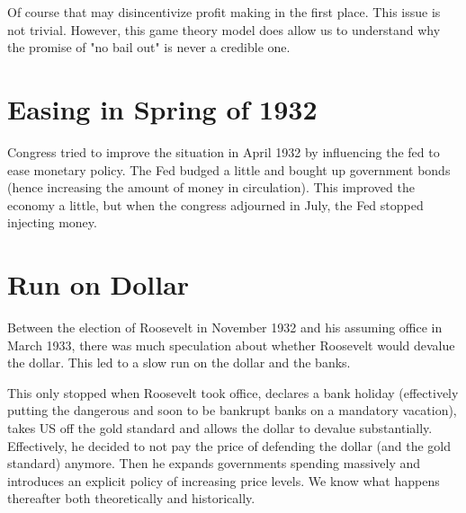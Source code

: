\documentclass[11pt]{scrartcl}
\begin{document}
Of course that may disincentivize profit making in the first place. This issue is not trivial. However, this game theory model does allow us to understand why the promise of "no bail out" is never a credible one.

\section{Easing in Spring of 1932}

Congress tried to improve the situation in April 1932 by influencing the fed to ease monetary policy. The Fed budged a little and bought up government bonds (hence increasing the amount of money in circulation). This improved the economy a little, but when the congress adjourned in July, the Fed stopped injecting money.

\section{Run on Dollar}

Between the election of Roosevelt in November 1932 and his assuming office in March 1933, there was much speculation about whether Roosevelt would devalue the dollar. This led to a slow run on the dollar and the banks.

This only stopped when Roosevelt took office, declares a bank holiday (effectively putting the dangerous and soon to be bankrupt banks on a mandatory vacation), takes US off the gold standard and allows the dollar to devalue substantially. Effectively, he decided to not pay the price of defending the dollar (and the gold standard) anymore. Then he expands governments spending massively and introduces an explicit policy of increasing price levels. We know what happens thereafter both theoretically and historically.
\end{document}
